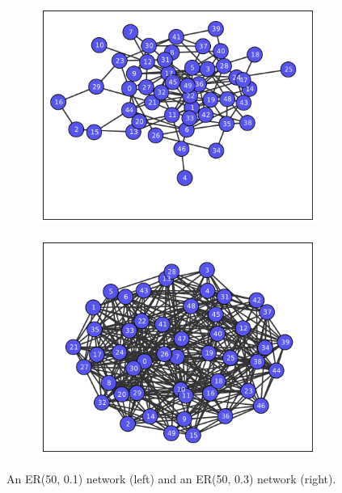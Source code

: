 \documentclass[11pt]{article} %
\begin{document}
\begin{figure}[t]
  \begin{subfigure}[b]{0.5\textwidth}
    \centering
    \includegraphics[width=\textwidth]{figures/ER_graph_50_01_init}
  \end{subfigure}
  \begin{subfigure}[b]{0.5\textwidth}
    \centering
    \includegraphics[width=\textwidth]{figures/ER_graph_50_03_init}
  \end{subfigure}
  \caption{An ER(50, 0.1) network (left) and an ER(50, 0.3) network (right).}
    \label{fig:graph_er}
\end{figure}
\end{document}
